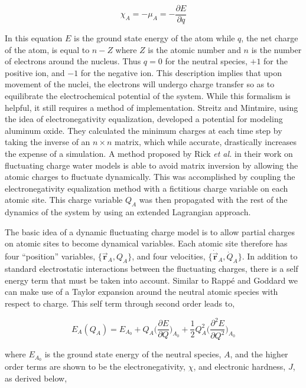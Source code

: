 \begin{equation}
\chi_A = -\mu_A = -\frac{\partial E}{\partial q}
\end{equation}

In this equation $E$ is the ground state energy of the atom while $q$, the net
charge of the atom, is equal to $n - Z$ where $Z$ is the atomic number and $n$
is the number of electrons around the nucleus. Thus $q = 0$ for the neutral
species, $+1$ for the positive ion, and $-1$ for the negative ion.  This
description implies that upon movement of the nuclei, the electrons will
undergo charge transfer so as to equilibrate the electrochemical potential of
the system. While this formalism is helpful, it still requires a method
of implementation.  Streitz and Mintmire, using the idea of electronegativity
equalization, developed a potential for modeling aluminum oxide. They
calculated the minimum charges at each time step by taking the inverse of an
$n\times n$ matrix, which while accurate, drastically increases the expense of a simulation.\citep{Streitz:1994mw} A method proposed by Rick {\it et
al.} in their work on fluctuating charge water models is able to avoid matrix inversion by
allowing the atomic charges to fluctuate dynamically. This was accomplished by
coupling the electronegativity equalization method with a fictitious charge
variable on each atomic site. This charge variable $Q_A$ was then propagated
with the rest of the dynamics of the system by using an extended Lagrangian
approach.\citep{Rick:1994ss}

The basic idea of a dynamic fluctuating charge model is to allow partial
charges on atomic sites to become dynamical variables.  Each atomic site
therefore has four ``position'' variables, $\{\vec{\mathbf{r}}_A, Q_A\}$, and
four velocities, $\{\dot{\vec{\mathbf{r}}}_A, \dot{Q}_A\}$.   In addition to
standard electrostatic interactions between the fluctuating charges, there is a
self energy term that must be taken into account. Similar to Rapp\'e and
Goddard\citep{Rappe:1991dq} we can make use of a Taylor expansion around the
neutral atomic species with respect to charge.  This self term through second
order leads to,

\begin{equation} \label{eqn:selfenergy}
E_A(Q_A) = E_{A_0} + Q_A\bigg( \frac{\partial E}{\partial Q} \bigg )_{A_0} +
\frac{1}{2}Q_A^2 \bigg(\frac{\partial^2E}{\partial Q^2}\bigg)_{A_0}
\end{equation}

where $E_{A_0}$ is the ground state energy of the neutral species, $A$, and the
higher order terms are shown to be the electronegativity, $\chi$, and
electronic hardness, $J$, as derived below,

